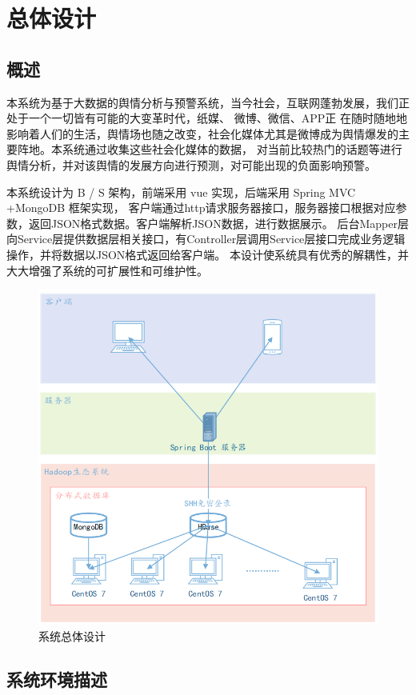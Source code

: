 \section{总体设计}
  
\subsection{概述}
本系统为基于大数据的舆情分析与预警系统，当今社会，互联网蓬勃发展，我们正处于一个一切皆有可能的大变革时代，纸媒、 微博、微信、APP正
在随时随地地影响着人们的生活，舆情场也随之改变，社会化媒体尤其是微博成为舆情爆发的主要阵地。本系统通过收集这些社会化媒体的数据，
对当前比较热门的话题等进行舆情分析，并对该舆情的发展方向进行预测，对可能出现的负面影响预警。

	本系统设计为 B / S 架构，前端采用 vue 实现，后端采用 Spring MVC +MongoDB 框架实现，
客户端通过http请求服务器接口，服务器接口根据对应参数，返回JSON格式数据。客户端解析JSON数据，进行数据展示。
后台Mapper层向Service层提供数据层相关接口，有Controller层调用Service层接口完成业务逻辑操作，并将数据以JSON格式返回给客户端。
本设计使系统具有优秀的解耦性，并大大增强了系统的可扩展性和可维护性。
\begin{figure}[!htbp]
	\centering
	\caption{系统总体设计}
	\includegraphics{image/a2.png}
\end{figure}
\subsection{系统环境描述}

